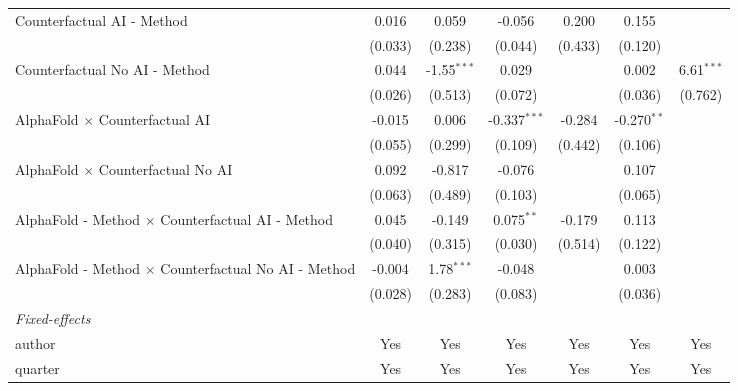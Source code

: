 \begin{tabular}{lcccccc}
   Counterfactual AI - Method                                 & 0.016   & 0.059         & -0.056         & 0.200        & 0.155         &   \\   
                                                              & (0.033) & (0.238)       & (0.044)        & (0.433)      & (0.120)       &   \\   
   Counterfactual No AI - Method                              & 0.044   & -1.55$^{***}$ & 0.029          &              & 0.002         & 6.61$^{***}$\\   
                                                              & (0.026) & (0.513)       & (0.072)        &              & (0.036)       & (0.762)\\   
   AlphaFold $\times$ Counterfactual AI                       & -0.015  & 0.006         & -0.337$^{***}$ & -0.284       & -0.270$^{**}$ &   \\   
                                                              & (0.055) & (0.299)       & (0.109)        & (0.442)      & (0.106)       &   \\   
   AlphaFold $\times$ Counterfactual No AI                    & 0.092   & -0.817        & -0.076         &              & 0.107         &   \\   
                                                              & (0.063) & (0.489)       & (0.103)        &              & (0.065)       &   \\   
   AlphaFold - Method $\times$ Counterfactual AI - Method     & 0.045   & -0.149        & 0.075$^{**}$   & -0.179       & 0.113         &   \\   
                                                              & (0.040) & (0.315)       & (0.030)        & (0.514)      & (0.122)       &   \\   
   AlphaFold - Method $\times$ Counterfactual No AI - Method  & -0.004  & 1.78$^{***}$  & -0.048         &              & 0.003         &   \\   
                                                              & (0.028) & (0.283)       & (0.083)        &              & (0.036)       &   \\   
   \midrule
   \emph{Fixed-effects}\\
   author                                                     & Yes     & Yes           & Yes            & Yes          & Yes           & Yes\\  
   quarter                                                    & Yes     & Yes           & Yes            & Yes          & Yes           & Yes\\  

\end{tabular}
